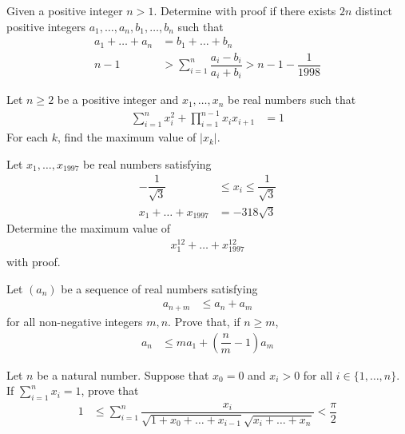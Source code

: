 \documentclass{subfile}
\begin{document}
		\begin{problem}[$1998$, problem $2$]
			Given a positive integer $n>1$. Determine with proof if there exists $2n$ distinct positive integers $a_{1},\ldots,a_{n},b_{1},\ldots,b_{n}$ such that
				\begin{align*}
					a_{1}+\ldots+a_{n}
						& = b_{1}+\ldots+b_{n}\\
					n-1
						& > \sum_{i=1}^{n}\dfrac{a_{i}-b_{i}}{a_{i}+b_{i}}>n-1-\dfrac{1}{1998}
				\end{align*}
		\end{problem}
	
		\begin{problem}[$1998$, problem $6$]
			Let $n\geq2$ be a positive integer and $x_{1},\ldots,x_{n}$ be real numbers such that
				\begin{align*}
					\sum_{i=1}^{n}x_{i}^{2}+\prod_{i=1}^{n-1}x_{i}x_{i+1}
						& = 1
				\end{align*}
			For each $k$, find the maximum value of $|x_{k}|$.
		\end{problem}
	
		\begin{problem}[$1997$, problem $1$]
			Let $x_{1},\ldots,x_{1997}$ be real numbers satisfying
				\begin{align*}
					-\dfrac{1}{\sqrt{3}}
						& \leq x_{i}\leq\dfrac{1}{\sqrt{3}}\\
					x_{1}+\ldots+x_{1997}
						& = -318\sqrt{3}
				\end{align*}
			Determine the maximum value of
				\begin{align*}
					x_{1}^{12}+\ldots+x_{1997}^{12}
				\end{align*}
			with proof.
		\end{problem}
	
		\begin{problem}[$1997$, problem $6$]
			Let $(a_n)$ be a sequence of real numbers satisfying
				\begin{align*}
					a_{n+m}
						& \leq a_{n}+a_{m}
				\end{align*}
			for all non-negative integers $m,n$. Prove that, if $n\geq m$,
				\begin{align*}
					a_{n}
						& \leq ma_{1}+\left(\dfrac{n}{m}-1\right)a_{m}
				\end{align*} 
		\end{problem}
	
		\begin{problem}[$1996$, problem $2$]
			Let $n$ be a natural number. Suppose that $x_{0}=0$ and $x_{i}>0$ for all $i\in\{1,\ldots,n\}$. If $\sum_{i=1}^{n}x_{i}=1$, prove that
				\begin{align*}
					1
						& \leq \sum_{i=1}^{n}\dfrac{x_{i}}{\sqrt{1+x_{0}+\ldots+x_{i-1}}\sqrt{x_{i}+\ldots+x_{n}}}
							< \dfrac{\pi}{2}
				\end{align*}
		\end{problem}
	
\end{document}
